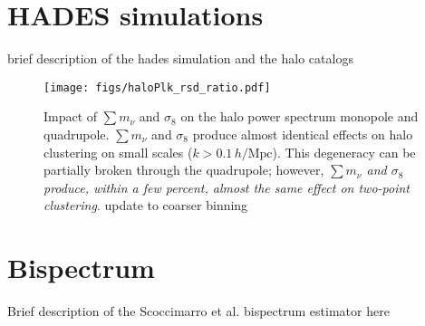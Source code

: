 \documentclass[12pt, letterpaper, preprint]{aastex62}
\newcommand{\smnu}{\sum m_\nu}
\newcommand{\sig}{\sigma_8}
\newcommand{\hmpc}{\,h/\mathrm{Mpc}}
\newcommand{\ch}[1]{{\color{orange}{\bf CH:} #1}}
\begin{document}
\section{HADES simulations} \label{sec:hades} 
brief description of the hades simulation and the halo catalogs

\begin{figure}
\begin{center}
\texttt{[image: figs/haloPlk\_rsd\_ratio.pdf]}
    \caption{Impact of $\smnu$ and $\sig$ on the halo power spectrum monopole 
    and quadrupole. $\smnu$ and $\sig$ produce almost identical effects on halo 
    clustering on small scales ($k > 0.1\hmpc$). This degeneracy can be partially 
    broken through the quadrupole; however, {\em $\smnu$ and $\sig$ produce, within 
    a few percent, almost the same effect on two-point clustering}.
    \ch{update to coarser binning}}
\label{fig:plk}
\end{center}
\end{figure}

\section{Bispectrum} \label{sec:bk} 
Brief description of the Scoccimarro et al. bispectrum estimator here 
\end{document}
